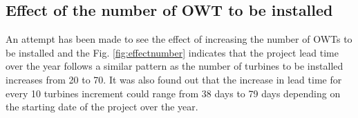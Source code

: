 \subsection{Effect of the number of OWT to be installed}

An attempt has been made to see the effect of increasing the number of OWTs to be installed and the Fig. \ref{fig:effectnumber} indicates that the project lead time over the year follows a similar pattern as the number of turbines to be installed increases from 20 to 70. It was also found out that the increase in lead time for every 10 turbines increment could range from 38 days to 79 days depending on the starting date of the project over the year.  

 